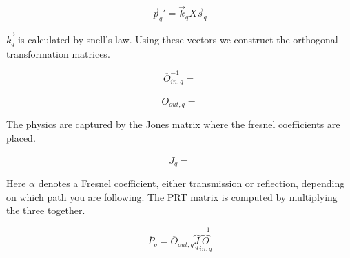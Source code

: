 \documentclass{article}
\begin{document}
	\begin{equation}
		\vec{p}_{q}' = \vec{k}_{q} X \vec{s}_{q} 
	\end{equation}
	
	$\vec{k_{q}}$ is calculated by snell's law. Using these vectors we construct the orthogonal transformation matrices.
	
	\begin{equation}
		\overline{O}_{in,q}^{-1} = 
	\end{equation}

	\begin{equation}
		\overline{O}_{out,q} = 
	\end{equation}

	The physics are captured by the Jones matrix where the fresnel coefficients are placed.
	
	\begin{equation}
		\overline{J_{q}} = 
	\end{equation} 

	Here $\alpha$ denotes a Fresnel coefficient, either transmission or reflection, depending on which path you are following. The PRT matrix is computed by multiplying the three together.
	
	\begin{equation}
		\overline{P}_{q} = \overline{O}_{out,q} \overbrace{J}_{q} \overbrace{O}_{in,q}^{-1}
	\end{equation}
\end{document}
